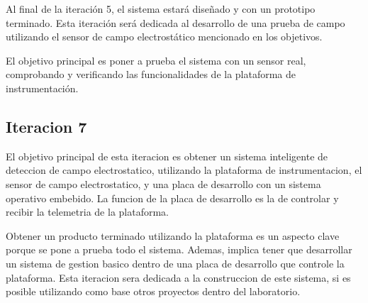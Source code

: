 Al final de la iteración 5, el sistema estará diseñado y con un prototipo terminado. Esta iteración será dedicada al desarrollo de una prueba de campo utilizando el sensor de campo electrostático mencionado en los objetivos. 

El objetivo principal es poner a prueba el sistema con un sensor real, comprobando y verificando las funcionalidades de la plataforma de instrumentación.



\subsection{Iteracion 7} %
\label{sub:iteracion_7}

El objetivo principal de esta iteracion es obtener un sistema inteligente de deteccion de campo electrostatico, utilizando la plataforma de instrumentacion, el sensor de campo electrostatico, y una placa de desarrollo con un sistema operativo embebido. La funcion de la placa de desarrollo es la de controlar y recibir la telemetria de la plataforma. 

Obtener un producto terminado utilizando la plataforma es un aspecto clave porque se pone a prueba todo el sistema. Ademas, implica tener que desarrollar un sistema de gestion basico dentro de una placa de desarrollo que controle la plataforma. Esta iteracion sera dedicada a la construccion de este sistema, si es posible utilizando como base otros proyectos dentro del laboratorio.







